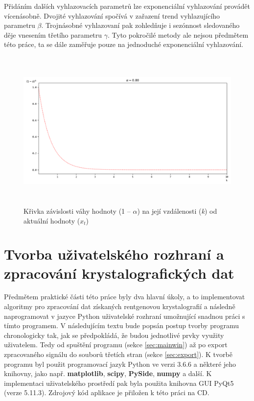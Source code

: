 \documentclass[a4paper, 12pt]{article}
\begin{document}
Přidáním dalších vyhlazovacích parametrů lze exponenciální vyhlazování provádět vícenásobně. Dvojité vyhlazování spočívá v zařazení trend vyhlazujícího parametru $\beta$. Trojnásobné vyhlazovaní pak zohledňuje i sezónnost sledovaného děje vnesením třetího parametru $\gamma$. Tyto pokročilé metody ale nejsou předmětem této práce, ta se dále zaměřuje pouze na jednoduché exponenciální vyhlazování.

\begin{figure}[hbt!]
    \centering
    \includegraphics[width=\linewidth,height=8cm]{EMAexp1.png}
    \caption{Křivka závislosti váhy hodnoty (1 -- $\alpha$) na její vzdálenosti (\textit{k}) od aktuální hodnoty (\textit{$x_t$})}
    \label{fig:EMAexp}
\end{figure}

\clearpage
\section{Tvorba uživatelského rozhraní a zpracování krystalografických dat} \label{sec:prakticka}
Předmětem praktické části této práce byly dva hlavní úkoly, a to implementovat algoritmy pro zpracování dat získaných rentgenovou krystalografií a následně naprogramovat v jazyce Python uživatelské rozhraní umožnující snadnou práci s tímto programem. V následujícím textu bude popsán postup tvorby programu chronologicky tak, jak se předpokládá, že budou jednotlivé prvky využity uživatelem. Tedy od spuštění programu (sekce \ref{sec:mainwin}) až po export zpracovaného signálu do souborů třetích stran (sekce \ref{sec:export}). K tvorbě programu byl použit programovací jazyk Python ve verzi 3.6.6 a některé jeho knihovny, jako např. \textbf{matplotlib}, \textbf{scipy}, \textbf{PySide}, \textbf{numpy} a další. K implementaci uživatelského prostředí pak byla použita knihovna GUI PyQt5 (verze 5.11.3). \textcolor{cdorange}{Zdrojový kód aplikace je přiložen k této práci na CD}.
\end{document}
